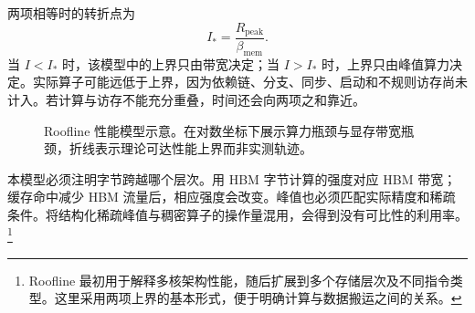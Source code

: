 \documentclass[../textbook.tex]{subfiles}
\begin{document}
两项相等时的转折点为
\begin{equation}
 I_*=\frac{R_{\mathrm{peak}}}{\beta_{\mathrm{mem}}}.
\end{equation}
当 $I<I_*$ 时，该模型中的上界只由带宽决定；当 $I>I_*$ 时，上界只由峰值算力决定。实际算子可能远低于上界，因为依赖链、分支、同步、启动和不规则访存尚未计入。若计算与访存不能充分重叠，时间还会向两项之和靠近。

\begin{figure}[htbp]
\centering
{}
\caption[Roofline 性能模型示意]{Roofline 性能模型示意。在对数坐标下展示算力瓶颈与显存带宽瓶颈，折线表示理论可达性能上界而非实测轨迹。}\label{fig:infra-roofline}
\end{figure}

本模型必须注明字节跨越哪个层次。用 HBM 字节计算的强度对应 HBM 带宽；缓存命中减少 HBM 流量后，相应强度会改变。峰值也必须匹配实际精度和稀疏条件。将结构化稀疏峰值与稠密算子的操作量混用，会得到没有可比性的利用率。\footnote{Roofline 最初用于解释多核架构性能，随后扩展到多个存储层次及不同指令类型。这里采用两项上界的基本形式，便于明确计算与数据搬运之间的关系。}
\end{document}
